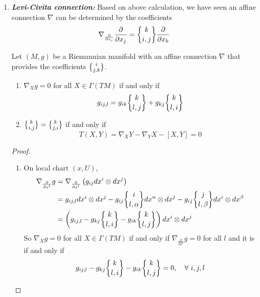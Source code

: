 \begin{enumerate}[label=\arabic{*}.]
	\item \textbf{\emph{Levi-Civita connection:}} Based on above calculation, we have seen an affine connection $\nabla$ can be determined by the coefficients
	\begin{equation*}
		\nabla_{\frac{\partial}{\partial x_i}}\frac{\partial}{\partial x_j} = \bracenom{k}{i,j}\frac{\partial}{\partial x_k}
	\end{equation*}
	\begin{prop}
		Let $(M,g)$ be a Riemannian manifold with an affine connection $\nabla$ that provides the coefficients $\bracenom{i}{j,k}$.
		\begin{enumerate}[label=(\arabic{*})] 
			\item $\nabla_Xg = 0$ for all $X \in \Gamma(TM)$ if and only if
			\begin{equation*}
				g_{ij,l} = g_{ik}\bracenom{k}{l,j} + g_{kj}\bracenom{k}{l,i}
			\end{equation*}

			\item $\bracenom{k}{i,j}=\bracenom{k}{j,i}$ if and only if
			\begin{equation*}
				T(X,Y) = \nabla_XY - \nabla_YX - [X,Y] = 0
			\end{equation*}
		\end{enumerate}
	\end{prop}
	\begin{proof}
		\begin{enumerate}[label=(\arabic{*})]
			\item On local chart $(x,U)$,
			\begin{equation*}
				\begin{aligned}
					\nabla_{\frac{\partial}{\partial x^l}}g &= \nabla_{\frac{\partial}{\partial x^l}}\bc{g_{ij}dx^i\otimes dx^j} \\
					&= g_{ij,l}dx^i\otimes dx^j -g_{ij}\bracenom{i}{l,\alpha}dx^\alpha\otimes dx^j - g_{ij}\bracenom{j}{l,\beta}dx^i\otimes dx^\beta \\
					&= \bc{g_{ij,l}-g_{kj}\bracenom{k}{l,i}-g_{ik}\bracenom{k}{l,j}}dx^i\otimes dx^j
				\end{aligned}
			\end{equation*}
			So $\nabla_Xg = 0$ for all $X \in \Gamma(TM)$ if and only if $\nabla_{\frac{\partial}{\partial x^l}}g = 0$ for all $l$ and it is if and only if 
			\begin{equation*}
				g_{ij,l}-g_{kj}\bracenom{k}{l,i}-g_{ik}\bracenom{k}{l,j} = 0,\quad \forall~ i,j,l
			\end{equation*}


\end{enumerate}
\end{proof}
\end{enumerate}
